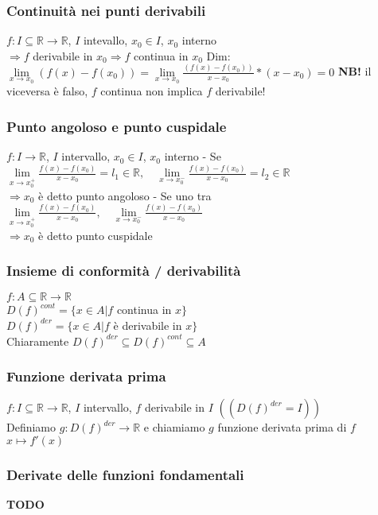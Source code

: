 \documentclass{article}
\begin{document}
\subsubsection{Continuità nei punti derivabili}
$f: I \subseteq \mathbb{R} \to \mathbb{R}$, $I$ intevallo, $x_0 \in I$, $x_0$ interno\\
$\Rightarrow f$ derivabile in $x_0 \Rightarrow f$ continua in $x_0$
\bigbreak
\noindent Dim: $\lim\limits_{x \to x_0}(f(x)-f(x_0)) = \lim\limits_{x \to x_0}\frac{(f(x)-f(x_0))}{x-x_0}*(x-x_0) = 0$
\bigbreak
\textbf{NB!} il viceversa è falso, $f$ continua non implica $f$ derivabile!

\subsubsection{Punto angoloso e punto cuspidale}
$f: I \to \mathbb{R}$, $I$ intervallo, $ x_0 \in I$, $x_0$ interno
\bigbreak
\noindent - Se $\lim\limits_{x \to x_0^+}\frac{f(x)-f(x_0)}{x-x_0}=l_1 \in \mathbb{R}, \quad \lim\limits_{x \to x_0^-}\frac{f(x)-f(x_0)}{x-x_0}=l_2 \in \mathbb{R}$\\
$\Rightarrow x_0$ è detto punto angoloso
\bigbreak
\noindent - Se uno tra $\lim\limits_{x \to x_0^+}\frac{f(x)-f(x_0)}{x-x_0}, \quad \lim\limits_{x \to x_0^-}\frac{f(x)-f(x_0)}{x-x_0}$\\
$\Rightarrow x_0$ è detto punto cuspidale

\subsubsection{Insieme di conformità / derivabilità}
$f:A \subseteq \mathbb{R} \to \mathbb{R}$\\
$D(f)^{cont} = \{x \in A | f$ continua in $x \}$\\
$D(f)^{der} = \{x \in A | f$ è derivabile in $x \}$\\
Chiaramente $D(f)^{der} \subseteq D(f)^{cont} \subseteq A$

\subsubsection{Funzione derivata prima}
$f: I \subseteq \mathbb{R} \to \mathbb{R}$, $I$ intervallo, $f$ derivabile in $I$ $((D(f)^{der}=I))$\\
Definiamo $g: D(f)^{der} \to \mathbb{R}$ e chiamiamo $g$ funzione derivata prima di $f$\\
\indent $x \mapsto f'(x)$

\subsubsection{Derivate delle funzioni fondamentali}
\textbf{TODO}
\end{document}
